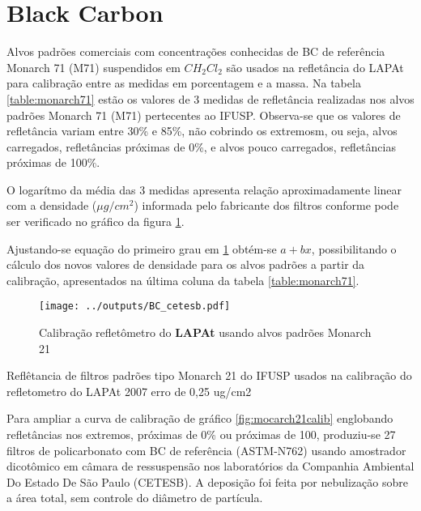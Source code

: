 \section{Black Carbon}

Alvos padrões comerciais com concentrações conhecidas de BC de referência 
Monarch 71 (M71) suspendidos em $CH_2Cl_2$ \citep{clarke1986} são usados na 
refletância do LAPAt para calibração entre as medidas em porcentagem e a massa.
Na tabela \ref{table:monarch71} estão os valores de 3 medidas de refletância  
realizadas nos alvos padrões Monarch 71 (M71) pertecentes ao IFUSP.
Observa-se que os valores de refletância variam entre 30\% e 85\%, não cobrindo
os extremosm, ou seja, alvos carregados, refletâncias próximas de 0\%, e alvos
pouco carregados, refletâncias próximas de 100\%.

O logarítmo da média das 3 medidas apresenta relação aproximadamente linear 
com a densidade ($\mu g /cm^2$) informada pelo fabricante dos filtros 
conforme pode ser verificado no gráfico da figura \ref{fig:monarch71}.

Ajustando-se equação do primeiro grau em \ref{fig:monarch71} obtém-se 
$a + bx$, possibilitando o cálculo dos novos valores de densidade para os 
alvos padrões a partir da calibração, apresentados na última coluna da tabela 
\ref{table:monarch71}.

\begin{figure}[H]
  \centering
  \texttt{[image: ../outputs/BC\_cetesb.pdf]}
  \caption{Calibração refletômetro do \textbf{LAPAt} usando alvos padrões Monarch 21
         \label{fig:monarch71}}
\end{figure}

\newpage
\begin{table}[H]
  \centering
  \small
    
    \caption{Reflêtancia de filtros padrões tipo Monarch 21 \citep{clarke1986} 
           do IFUSP usados na calibração do refletometro do 
           LAPAt 2007  erro de 0,25 ug/cm2 \label{table:monarch71}}
\end{table} 
\newpage


Para ampliar a curva de calibração de gráfico \ref{fig:mocarch21calib} 
englobando refletâncias nos extremos, próximas de 0\% ou próximas de 100, 
produziu-se 27 filtros de policarbonato com BC de referência (ASTM-N762) 
usando amostrador dicotômico em câmara de ressuspensão nos laboratórios da 
Companhia Ambiental Do Estado De São Paulo (CETESB). 
A deposição foi feita por nebulização sobre a área total, 
sem controle do diâmetro de partícula.

